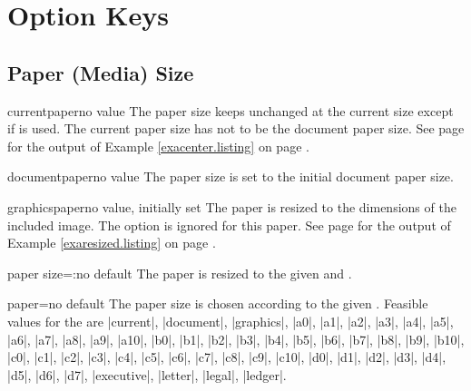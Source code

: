 \documentclass[a4paper,11pt]{ltxdoc}
\begin{document}
\clearpage
\section{Option Keys}\label{sec:keys}

\subsection{Paper (Media) Size}\label{sec:papersize}

\begin{docIgrKey}{currentpaper}{}{no value}
  The paper size keeps unchanged at the current size
  except if  is used.
  The current paper size has not to
  be the document paper size.
  See page \pageref{exacenter} for the output
  of Example \ref{exacenter.listing} on page \pageref{exacenter.listing}.
\end{docIgrKey}

\begin{docIgrKey}{documentpaper}{}{no value}
  The paper size is set to the initial document paper size.
\end{docIgrKey}

\begin{docIgrKey}{graphicspaper}{}{no value, initially set}
  The paper is resized to the dimensions of the included image.
  The  option is ignored for this paper.
  See page \pageref{exaresized} for the output
  of Example \ref{exaresized.listing} on page \pageref{exaresized.listing}.
\end{docIgrKey}


\begin{docIgrKey}{paper size}{=:}{no default}
  The paper is resized to the given  and .
\end{docIgrKey}

\begin{docIgrKey}{paper}{=}{no default}
  The paper size is chosen according to the given .
  Feasible values for the  are
  |current|, |document|, |graphics|,
  |a0|, |a1|, |a2|, |a3|, |a4|, |a5|, |a6|, |a7|, |a8|, |a9|, |a10|,
  |b0|, |b1|, |b2|, |b3|, |b4|, |b5|, |b6|, |b7|, |b8|, |b9|, |b10|,
  |c0|, |c1|, |c2|, |c3|, |c4|, |c5|, |c6|, |c7|, |c8|, |c9|, |c10|,
  |d0|, |d1|, |d2|, |d3|, |d4|, |d5|, |d6|, |d7|,
  |executive|, |letter|, |legal|, |ledger|.
\end{docIgrKey}
\end{document}
